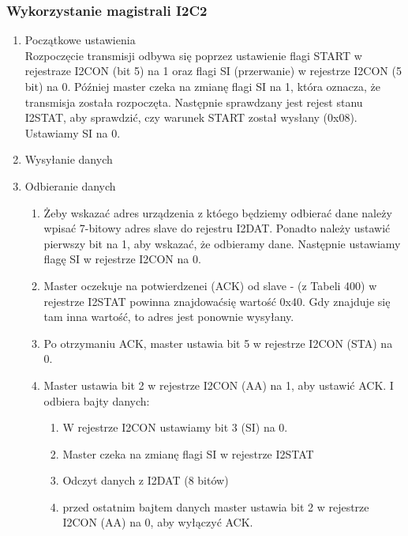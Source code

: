 \documentclass{article}
\begin{document}
\subsubsection{Wykorzystanie magistrali I2C2}
\begin{enumerate}
    \item Początkowe ustawienia\\
        Rozpoczęcie transmisji odbywa się poprzez ustawienie flagi START w rejestraze I2CON (bit 5) na 1 oraz flagi SI (przerwanie) w rejestrze I2CON (5 bit) na 0. Później master czeka na zmianę flagi SI na 1, która oznacza, że transmisja została rozpoczęta. Następnie sprawdzany jest rejest stanu I2STAT, aby sprawdzić, czy warunek START został wysłany (0x08). Ustawiamy SI na 0.
    \item Wysyłanie danych\\
        
    
    \item Odbieranie danych\\
    \begin{enumerate}
        \item Żeby wskazać adres urządzenia z któego będziemy odbierać dane należy wpisać 7-bitowy adres slave do rejestru I2DAT. Ponadto należy ustawić pierwszy bit na 1, aby wskazać, że odbieramy dane. Następnie ustawiamy flagę SI w rejestrze I2CON na 0.
        \item Master oczekuje na potwierdzenei (ACK) od slave - (z Tabeli 400) w rejestrze I2STAT powinna znajdowaćsię wartość 0x40. Gdy znajduje się tam inna wartość, to adres jest ponownie wysyłany.
        \item Po otrzymaniu ACK, master ustawia bit 5 w rejestrze I2CON (STA) na 0.
        \item Master ustawia bit 2 w rejestrze I2CON (AA) na 1, aby ustawić ACK. I odbiera bajty danych:
        \begin{enumerate}
            \item W rejestrze I2CON ustawiamy bit 3 (SI) na 0.
            \item Master czeka na zmianę flagi SI w rejestrze I2STAT
            \item Odczyt danych z I2DAT (8 bitów)
            \item przed ostatnim bajtem danych master ustawia bit 2 w rejestrze I2CON (AA) na 0, aby wyłączyć ACK.
        \end{enumerate}    
    \end{enumerate}    


\end{enumerate}
\end{document}
